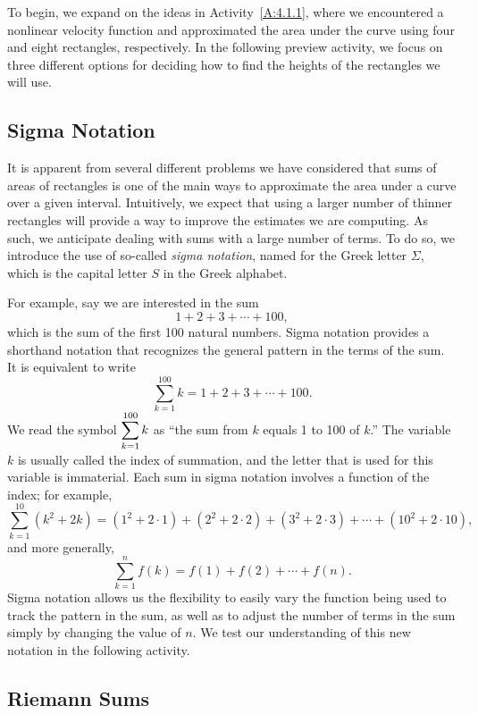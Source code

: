 To begin, we expand on the ideas in Activity~\ref{A:4.1.1}, where we encountered a nonlinear velocity function and approximated the area under the curve using four and eight rectangles, respectively.  In the following preview activity, we focus on three different options for deciding how to find the heights of the rectangles we will use.



\subsection*{Sigma Notation}

It is apparent from several different problems we have considered that sums of areas of rectangles is one of the main ways to approximate the area under a curve over a given interval.  Intuitively, we expect that using a larger number of thinner rectangles will provide a way to improve the estimates we are computing.  As such, we anticipate dealing with sums with a large number of terms.  To do so, we introduce the use of so-called \emph{sigma notation}, named for the Greek letter $\Sigma$, which is the capital letter $S$ in the Greek alphabet.

For example, say we are interested in the sum
$$1 + 2 + 3 + \cdots + 100,$$
which is the sum of the first 100 natural numbers.  Sigma notation provides a shorthand notation that recognizes the general pattern in the terms of the sum.  It is equivalent to write
$$\sum_{k=1}^{100} k =  1 + 2 + 3 + \cdots + 100.$$
We read the symbol $\displaystyle \sum_{k=1}^{100} k$ as ``the sum from $k$ equals 1 to 100 of $k$.''  The variable $k$ is usually called the index of summation, and the letter that is used for this variable is immaterial.  Each sum in sigma notation involves a function of the index; for example,
$$\sum_{k=1}^{10} (k^2 + 2k) =  (1^2 + 2\cdot 1) + (2^2 + 2\cdot 2) + (3^2 + 2\cdot 3) + \cdots + (10^2 + 2\cdot 10),$$
and more generally,
$$\sum_{k=1}^n f(k) = f(1) + f(2) + \cdots + f(n).$$
Sigma notation allows us the flexibility to easily vary the function being used to track the pattern in the sum, as well as to adjust the number of terms in the sum simply by changing the value of $n$.  We test our understanding of this new notation in the following activity.



\subsection*{Riemann Sums}

